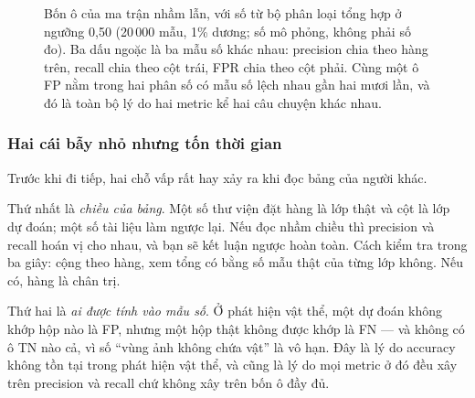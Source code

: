 \documentclass[../../deep_learning.tex]{subfiles}
\begin{document}
\begin{figure}[H]
{}
\caption{Bốn ô của ma trận nhầm lẫn, với số từ bộ phân loại tổng hợp ở ngưỡng 0{,}50 (20\,000 mẫu, 1\% dương; số mô phỏng, không phải số đo). Ba dấu ngoặc là ba mẫu số khác nhau: precision chia theo hàng trên, recall chia theo cột trái, FPR chia theo cột phải. Cùng một ô FP nằm trong hai phân số có mẫu số lệch nhau gần hai mươi lần, và đó là toàn bộ lý do hai metric kể hai câu chuyện khác nhau.}
\label{fig:b07-cm}
\end{figure}

\subsubsection{Hai cái bẫy nhỏ nhưng tốn thời gian}
Trước khi đi tiếp, hai chỗ vấp rất hay xảy ra khi đọc bảng của người khác.

Thứ nhất là \emph{chiều của bảng}. Một số thư viện đặt hàng là lớp thật và cột là lớp dự đoán; một số tài liệu làm ngược lại. Nếu đọc nhầm chiều thì precision và recall hoán vị cho nhau, và bạn sẽ kết luận ngược hoàn toàn. Cách kiểm tra trong ba giây: cộng theo hàng, xem tổng có bằng số mẫu thật của từng lớp không. Nếu có, hàng là chân trị.

Thứ hai là \emph{ai được tính vào mẫu số}. Ở phát hiện vật thể, một dự đoán không khớp hộp nào là FP, nhưng một hộp thật không được khớp là FN --- và không có ô TN nào cả, vì số ``vùng ảnh không chứa vật'' là vô hạn. Đây là lý do accuracy không tồn tại trong phát hiện vật thể, và cũng là lý do mọi metric ở đó đều xây trên precision và recall chứ không xây trên bốn ô đầy đủ.
\end{document}
